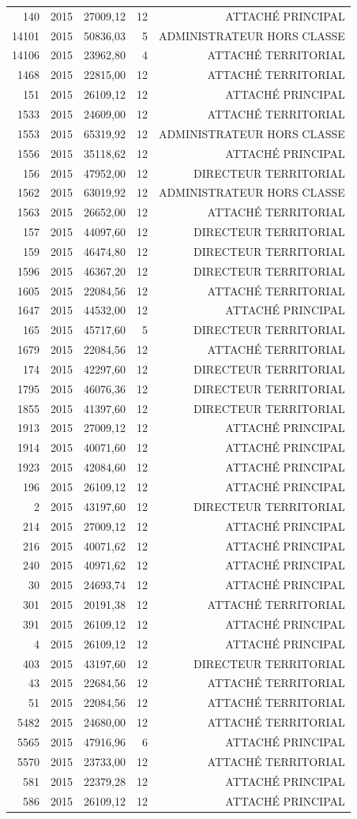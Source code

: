 \begin{longtable}[]{@{}rrrrr@{}}
140 & 2015 & 27009,12 & 12 & ATTACHÉ PRINCIPAL\tabularnewline
14101 & 2015 & 50836,03 & 5 & ADMINISTRATEUR HORS CLASSE\tabularnewline
14106 & 2015 & 23962,80 & 4 & ATTACHÉ TERRITORIAL\tabularnewline
1468 & 2015 & 22815,00 & 12 & ATTACHÉ TERRITORIAL\tabularnewline
151 & 2015 & 26109,12 & 12 & ATTACHÉ PRINCIPAL\tabularnewline
1533 & 2015 & 24609,00 & 12 & ATTACHÉ TERRITORIAL\tabularnewline
1553 & 2015 & 65319,92 & 12 & ADMINISTRATEUR HORS CLASSE\tabularnewline
1556 & 2015 & 35118,62 & 12 & ATTACHÉ PRINCIPAL\tabularnewline
156 & 2015 & 47952,00 & 12 & DIRECTEUR TERRITORIAL\tabularnewline
1562 & 2015 & 63019,92 & 12 & ADMINISTRATEUR HORS CLASSE\tabularnewline
1563 & 2015 & 26652,00 & 12 & ATTACHÉ TERRITORIAL\tabularnewline
157 & 2015 & 44097,60 & 12 & DIRECTEUR TERRITORIAL\tabularnewline
159 & 2015 & 46474,80 & 12 & DIRECTEUR TERRITORIAL\tabularnewline
1596 & 2015 & 46367,20 & 12 & DIRECTEUR TERRITORIAL\tabularnewline
1605 & 2015 & 22084,56 & 12 & ATTACHÉ TERRITORIAL\tabularnewline
1647 & 2015 & 44532,00 & 12 & ATTACHÉ PRINCIPAL\tabularnewline
165 & 2015 & 45717,60 & 5 & DIRECTEUR TERRITORIAL\tabularnewline
1679 & 2015 & 22084,56 & 12 & ATTACHÉ TERRITORIAL\tabularnewline
174 & 2015 & 42297,60 & 12 & DIRECTEUR TERRITORIAL\tabularnewline
1795 & 2015 & 46076,36 & 12 & DIRECTEUR TERRITORIAL\tabularnewline
1855 & 2015 & 41397,60 & 12 & DIRECTEUR TERRITORIAL\tabularnewline
1913 & 2015 & 27009,12 & 12 & ATTACHÉ PRINCIPAL\tabularnewline
1914 & 2015 & 40071,60 & 12 & ATTACHÉ PRINCIPAL\tabularnewline
1923 & 2015 & 42084,60 & 12 & ATTACHÉ PRINCIPAL\tabularnewline
196 & 2015 & 26109,12 & 12 & ATTACHÉ PRINCIPAL\tabularnewline
2 & 2015 & 43197,60 & 12 & DIRECTEUR TERRITORIAL\tabularnewline
214 & 2015 & 27009,12 & 12 & ATTACHÉ PRINCIPAL\tabularnewline
216 & 2015 & 40071,62 & 12 & ATTACHÉ PRINCIPAL\tabularnewline
240 & 2015 & 40971,62 & 12 & ATTACHÉ PRINCIPAL\tabularnewline
30 & 2015 & 24693,74 & 12 & ATTACHÉ PRINCIPAL\tabularnewline
301 & 2015 & 20191,38 & 12 & ATTACHÉ TERRITORIAL\tabularnewline
391 & 2015 & 26109,12 & 12 & ATTACHÉ PRINCIPAL\tabularnewline
4 & 2015 & 26109,12 & 12 & ATTACHÉ PRINCIPAL\tabularnewline
403 & 2015 & 43197,60 & 12 & DIRECTEUR TERRITORIAL\tabularnewline
43 & 2015 & 22684,56 & 12 & ATTACHÉ TERRITORIAL\tabularnewline
51 & 2015 & 22084,56 & 12 & ATTACHÉ TERRITORIAL\tabularnewline
5482 & 2015 & 24680,00 & 12 & ATTACHÉ TERRITORIAL\tabularnewline
5565 & 2015 & 47916,96 & 6 & ATTACHÉ PRINCIPAL\tabularnewline
5570 & 2015 & 23733,00 & 12 & ATTACHÉ TERRITORIAL\tabularnewline
581 & 2015 & 22379,28 & 12 & ATTACHÉ PRINCIPAL\tabularnewline
586 & 2015 & 26109,12 & 12 & ATTACHÉ PRINCIPAL\tabularnewline

\end{longtable}
